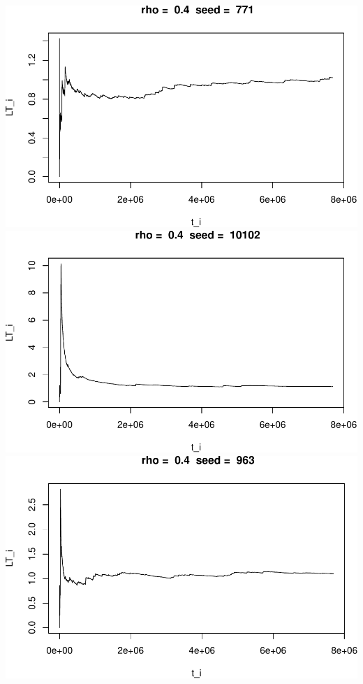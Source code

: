 \documentclass[]{article}
\begin{document}
\includegraphics{003_files/figure-latex/unnamed-chunk-15-1.pdf}
\includegraphics{003_files/figure-latex/unnamed-chunk-15-2.pdf}
\includegraphics{003_files/figure-latex/unnamed-chunk-15-3.pdf}
\end{document}
